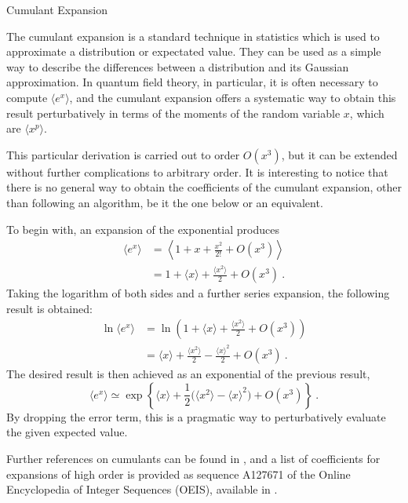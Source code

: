 \begin{chapter}{Cumulant Expansion}
\label{app:cumul}

\hspace{5 mm}

The cumulant expansion is a standard technique in statistics which is used to approximate a distribution or expectated value. They can be used as a simple way to describe the differences between a distribution and its Gaussian approximation. In quantum field theory, in particular, it is often necessary to compute $\langle e^x \rangle$, and the cumulant expansion offers a systematic way to obtain this result perturbatively in terms of the moments of the random variable $x$, which are $\langle x^p \rangle$.


This particular derivation is carried out to order $O(x^3)$, but it can be extended without further complications to arbitrary order. It is interesting to notice that there is no general way to obtain the coefficients of the cumulant expansion, other than following an algorithm, be it the one below or an equivalent.

To begin with, an expansion of the exponential produces
\begin{equation}
\begin{split}
	\langle e^x \rangle &= \left\langle 1 + x + \frac{x^2}{2!} + O(x^3) \right\rangle \\
	&= 1 + \langle x \rangle + \frac{ \langle x^2 \rangle}{2} + O(x^3) \ .
\end{split}
\end{equation}
Taking the logarithm of both sides and a further series expansion, the following result is obtained:
\begin{equation}
\begin{split}	
	\ln \langle e^x \rangle &= \ln \left( 1 + \langle x \rangle + \frac{\langle x^2 \rangle}{2} + O(x^3) \right) \\
	&= \langle x \rangle + \frac{\langle x^2 \rangle}{2} - \frac{ \langle x \rangle^2}{2} + O(x^3) \ .
\end{split}
\end{equation}
The desired result is then achieved as an exponential of the previous result,
\begin{equation}
	\langle e^x \rangle \simeq \exp\left\{ \langle x \rangle + \frac12 \big( \langle x^2 \rangle - \langle x \rangle^2 \big) + O(x^3) \right\} \ .
\end{equation}
By dropping the error term, this is a pragmatic way to perturbatively evaluate the given expected value.

Further references on cumulants can be found in \textcite{cumulants,novak2012}, and a list of coefficients for expansions of high order is provided as sequence A127671 of the Online Encyclopedia of Integer Sequences (OEIS), available in \textcite{oeis_cumul}.

\end{chapter}
